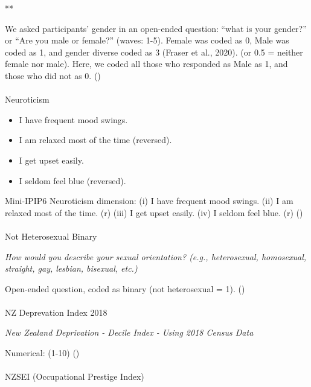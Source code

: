 \documentclass[
  single column]{article}
\makeatletter
\let\oldparagraph\paragraph
\renewcommand{\paragraph}{
    \@ifstar
      \xxxParagraphStar
      \xxxParagraphNoStar
  }
\newcommand{\xxxParagraphStar}[1]{\oldparagraph*{#1}\mbox{}}
\newcommand{\xxxParagraphNoStar}[1]{\oldparagraph{#1}\mbox{}}
\providecommand{\tightlist}{%
  \setlength{\itemsep}{0pt}\setlength{\parskip}{0pt}}\usepackage{longtable,booktabs,array}
\makeatother
\begin{document}
**

We asked participants' gender in an open-ended question: ``what is your
gender?'' or ``Are you male or female?'' (waves: 1-5). Female was coded
as 0, Male was coded as 1, and gender diverse coded as 3 (Fraser et al.,
2020). (or 0.5 = neither female nor male). Here, we coded all those who
responded as Male as 1, and those who did not as 0.
()

\paragraph{Neuroticism}\label{neuroticism}

\begin{itemize}
\tightlist
\item
  I have frequent mood swings.
\item
  I am relaxed most of the time (reversed).
\item
  I get upset easily.
\item
  I seldom feel blue (reversed).
\end{itemize}

Mini-IPIP6 Neuroticism dimension: (i) I have frequent mood swings. (ii)
I am relaxed most of the time. (r) (iii) I get upset easily. (iv) I
seldom feel blue. (r) ()

\paragraph{Not Heterosexual Binary}\label{not-heterosexual-binary}

\emph{How would you describe your sexual orientation? (e.g.,
heterosexual, homosexual, straight, gay, lesbian, bisexual, etc.)}

Open-ended question, coded as binary (not heterosexual = 1).
()

\paragraph{NZ Deprevation Index 2018}\label{nz-deprevation-index-2018}

\emph{New Zealand Deprivation - Decile Index - Using 2018 Census Data}

Numerical: (1-10) ()

\paragraph{NZSEI (Occupational Prestige
Index)}\label{nzsei-occupational-prestige-index}
\end{document}
